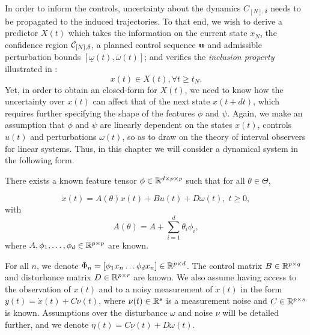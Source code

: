 In order to inform the controls, uncertainty about the dynamics $C_{[N],\delta}$ needs to be propagated to the induced trajectories. To that end, we wish to derive a predictor $X(t)$ which takes the information on the current state ${x}_N$, the confidence region $\mathcal{C}_{[N],\delta}$, a planned control sequence $\mathbf{u}$ and admissible perturbation bounds $[\underline{\omega}(t),\overline{\omega}(t)]$; and verifies the \emph{inclusion property} illustrated in :
\begin{equation*}
x(t)\in X(t), \forall t\geq t_N.
\end{equation*}
Yet, in order to obtain an closed-form for $X(t)$, we need to know how the uncertainty over $x(t)$ can affect that of the next state $x(t+dt)$, which requires further specifying the shape of the features $\phi$ and $\psi$. Again, we make an assumption that $\phi$ and $\psi$ are linearly dependent on the states $x(t)$, controls $u(t)$ and perturbations $\omega(t)$, so as to draw on the theory of interval observers for linear systems. Thus, in this chapter we will consider a dynamical system in the following form.

\begin{assumption}
	\label{assumpt:structure}
	\begin{leftbar}[assumptionbar]
		There exists a known feature tensor $\phi\in \mathbb{R}^{d \times p \times p}$ such that for all $\theta\in\Theta$,
		
		\begin{equation}
		\label{eq:dynamics}
		\dot{x}(t)=A(\theta)x(t) + B u(t) + D \omega(t),\;t\geq0,
		\end{equation}
		with
		\begin{equation}
		A(\theta) = A + %
		\sum_{i=1}^d \theta_i\phi_i,
		\end{equation}
		where $A,\phi_1,\dots,\phi_d\in\mathbb{R}^{p\times p}$ are known. 
	\end{leftbar}
\end{assumption}
For all $n$, we denote $\Phi_n = [\phi_1 x_n \dots \phi_d x_n]\in\mathbb{R}^{p\times d}$.
The control matrix $B\in\mathbb{R}^{p\times q}$ and disturbance matrix $D\in\mathbb{R}^{p\times r}$ are known. We also assume having access to the observation of $x(t)$ and to a noisy measurement of $\dot{x}(t)$ in the form $y(t)=\dot{x}(t) + C\nu(t)$, where $\nu(t)\in\mathbb{R}^s$ is a measurement noise and $C\in\mathbb{R}^{p\times s}$ is known. Assumptions over the disturbance $\omega$ and noise $\nu$ will be detailed further, and we denote $\eta(t) = C\nu(t) + D\omega(t)$. 

